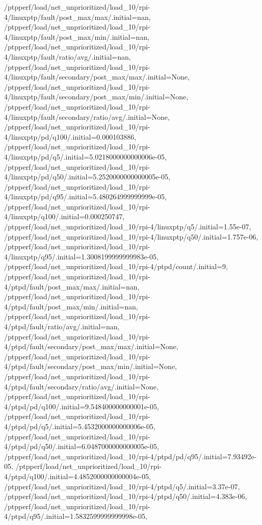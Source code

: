 {    /ptpperf/load/net_unprioritized/load_10/rpi-4/linuxptp/fault/post_max/max/.initial=nan,
    /ptpperf/load/net_unprioritized/load_10/rpi-4/linuxptp/fault/post_max/min/.initial=nan,
    /ptpperf/load/net_unprioritized/load_10/rpi-4/linuxptp/fault/ratio/avg/.initial=nan,
    /ptpperf/load/net_unprioritized/load_10/rpi-4/linuxptp/fault/secondary/post_max/max/.initial=None,
    /ptpperf/load/net_unprioritized/load_10/rpi-4/linuxptp/fault/secondary/post_max/min/.initial=None,
    /ptpperf/load/net_unprioritized/load_10/rpi-4/linuxptp/fault/secondary/ratio/avg/.initial=None,
    /ptpperf/load/net_unprioritized/load_10/rpi-4/linuxptp/pd/q100/.initial=0.000103886,
    /ptpperf/load/net_unprioritized/load_10/rpi-4/linuxptp/pd/q5/.initial=5.0218000000000006e-05,
    /ptpperf/load/net_unprioritized/load_10/rpi-4/linuxptp/pd/q50/.initial=5.2520000000000005e-05,
    /ptpperf/load/net_unprioritized/load_10/rpi-4/linuxptp/pd/q95/.initial=5.480264999999999e-05,
    /ptpperf/load/net_unprioritized/load_10/rpi-4/linuxptp/q100/.initial=0.000250747,
    /ptpperf/load/net_unprioritized/load_10/rpi-4/linuxptp/q5/.initial=1.55e-07,
    /ptpperf/load/net_unprioritized/load_10/rpi-4/linuxptp/q50/.initial=1.757e-06,
    /ptpperf/load/net_unprioritized/load_10/rpi-4/linuxptp/q95/.initial=1.3008199999999983e-05,
    /ptpperf/load/net_unprioritized/load_10/rpi-4/ptpd/count/.initial=9,
    /ptpperf/load/net_unprioritized/load_10/rpi-4/ptpd/fault/post_max/max/.initial=nan,
    /ptpperf/load/net_unprioritized/load_10/rpi-4/ptpd/fault/post_max/min/.initial=nan,
    /ptpperf/load/net_unprioritized/load_10/rpi-4/ptpd/fault/ratio/avg/.initial=nan,
    /ptpperf/load/net_unprioritized/load_10/rpi-4/ptpd/fault/secondary/post_max/max/.initial=None,
    /ptpperf/load/net_unprioritized/load_10/rpi-4/ptpd/fault/secondary/post_max/min/.initial=None,
    /ptpperf/load/net_unprioritized/load_10/rpi-4/ptpd/fault/secondary/ratio/avg/.initial=None,
    /ptpperf/load/net_unprioritized/load_10/rpi-4/ptpd/pd/q100/.initial=9.548400000000001e-05,
    /ptpperf/load/net_unprioritized/load_10/rpi-4/ptpd/pd/q5/.initial=5.4532000000000006e-05,
    /ptpperf/load/net_unprioritized/load_10/rpi-4/ptpd/pd/q50/.initial=6.0487000000000005e-05,
    /ptpperf/load/net_unprioritized/load_10/rpi-4/ptpd/pd/q95/.initial=7.93492e-05,
    /ptpperf/load/net_unprioritized/load_10/rpi-4/ptpd/q100/.initial=4.4852000000000004e-05,
    /ptpperf/load/net_unprioritized/load_10/rpi-4/ptpd/q5/.initial=3.37e-07,
    /ptpperf/load/net_unprioritized/load_10/rpi-4/ptpd/q50/.initial=4.383e-06,
    /ptpperf/load/net_unprioritized/load_10/rpi-4/ptpd/q95/.initial=1.5832599999999998e-05,
}
